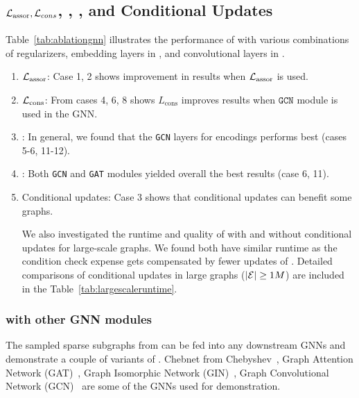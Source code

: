 \subsection{${\mathcal{L}}_\mathrm{assor}, {\mathcal{L}}_{cons}$, \edgemlp, \gnn, and Conditional Updates}
\label{subsec:ab_edgemlpgnn}

Table~\ref{tab:ablationgnn} illustrates the performance of \sgs with various combinations of regularizers, embedding layers in \edgemlp, and convolutional layers in \gnn. 

\begin{enumerate}
    \item ${\mathcal{L}}_\mathrm{assor}$: Case 1, 2 shows improvement in results when ${\mathcal{L}}_\mathrm{assor}$ is used.

    \item ${\mathcal{L}}_\mathrm{cons}$: From cases 4, 6, 8 shows $L_\mathrm{cons}$ improves results when $\texttt{GCN}$ module is used in the GNN.

    \item \edgemlp: In general, we found that the \texttt{GCN} layers for \edgemlp encodings performs best (cases 5-6, 11-12). 
    
    \item \gnn: Both \texttt{GCN} and  \texttt{GAT} modules yielded overall the best results (case 6, 11).
    
    \item Conditional updates: Case 3 shows that conditional updates can benefit some graphs.     
    
    We also investigated the runtime and quality of \sgs with and without conditional updates for large-scale graphs. We found both have similar runtime as the condition check expense gets compensated by fewer updates of \edgemlp. Detailed comparisons of conditional updates in large graphs ($|{\mathcal{E}}|\ge 1M$) are included in the Table~\ref{tab:largescaleruntime}.   
\end{enumerate}












\subsubsection{\sgs with other GNN modules}
\label{app:othergnn}
The sampled sparse subgraphs from \edgemlp can be fed into any downstream GNNs and demonstrate a couple of variants of \sgs. Chebnet from Chebyshev~\cite{he2022convolutional}, Graph Attention Network (GAT)~\cite{velivckovic2017graph}, Graph Isomorphic Network (GIN)~\cite{xu2018powerful}, Graph Convolutional Network (GCN)~\cite{kipf2016semi} are some of the GNNs used for demonstration. 

